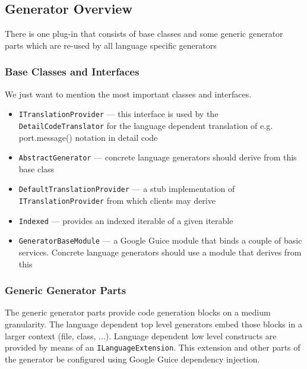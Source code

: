 \subsection{Generator Overview}

There is one plug-in that consists of base classes and some generic generator parts which are re-used by 
all language specific generators
 
\subsubsection{Base Classes and Interfaces}

We just want to mention the most important classes and interfaces.

\begin{itemize}
\item \begin{flushleft}\texttt{ITranslationProvider} --- this interface is used by the 
\texttt{DetailCodeTranslator} for the language dependent translation of e.g. port.message() notation in 
detail code\end{flushleft}
\item \texttt{AbstractGenerator} --- concrete language generators should derive from this base class
\item \begin{flushleft}\texttt{DefaultTranslationProvider} --- a stub implementation of 
\texttt{ITranslationProvider} from which clients may derive\end{flushleft}
\item \texttt{Indexed} --- provides an indexed iterable of a given iterable
\item \texttt{GeneratorBaseModule} --- a Google Guice module that binds a couple of basic services. 
Concrete language generators should use a module that derives from this
\end{itemize}

\subsubsection{Generic Generator Parts}

The generic generator parts provide code generation blocks on a medium granularity. The language dependent 
top level generators embed those blocks in a larger context (file, class, ...). Language dependent low 
level constructs are provided by means of an \texttt{ILanguageExtension}. This extension and other parts 
of the generator be configured using Google Guice dependency injection.

